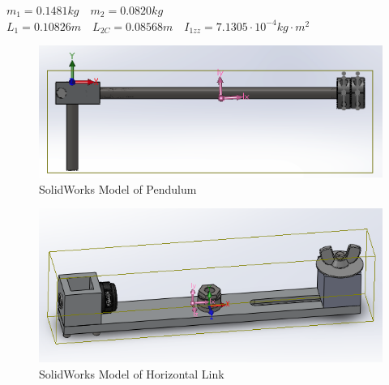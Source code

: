 \documentclass{article}
\theoremstyle{plain}
\theoremstyle{definition}
\theoremstyle{remark}
\begin{document}
\begin{center}
$m_{1} = 0.1481 kg \quad m_{2} = 0.0820 kg $\\
$ L_{1} = 0.10826 m \quad L_{2C} = 0.08568 m \quad I_{1zz} = 7.1305\cdot 10^{-4}kg\cdot m^{2}$
\end{center}

\begin{figure}[htb]
\begin{center}
\includegraphics[width = 14cm]{Pendulum.png}
\caption{SolidWorks Model of Pendulum}
\label{q2_3}
\end{center}
\end{figure}

\begin{figure}[htb]
\begin{center}
\includegraphics[width = 14cm]{Horizontal.png}
\caption{SolidWorks Model of Horizontal Link}
\label{q2_4}
\end{center}
\end{figure}
\end{document}
